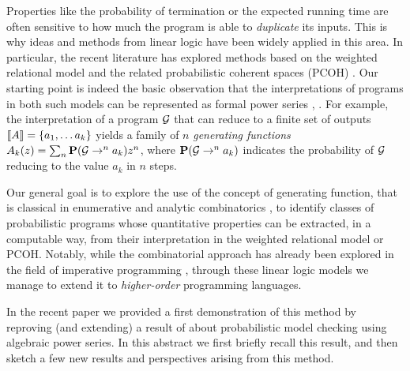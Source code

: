 \documentclass{easychair}
\begin{document}
Properties like the probability of termination or the expected running time are often sensitive to how much the program is able to \emph{duplicate} its inputs. This is why ideas and methods from linear logic have been widely applied in this area. 
%
In particular, the recent literature has explored methods based on the weighted relational model \cite{DBLP:conf/lics/LairdMMP13} and the related probabilistic coherent spaces (PCOH) \cite{DBLP:journals/jacm/EhrhardPT18}. 
Our starting point is indeed the basic observation that the interpretations of programs in both such models can be represented as formal power series \cite{DBLP:journals/corr/abs-2501-15637}, \cite{LAMARCHE199237}. For example, the interpretation of a program $\mathcal{G}$ that can reduce to a finite set of outputs $\llbracket A\rrbracket=\{a_1, \dots a_k\}$ yields a family of $n$ \emph{generating functions} $A_k(z) = \sum_n \mathbf{P}(\mathcal{G} \to^n a_k)z^n$, where $\mathbf{P}(\mathcal{G} \to^n a_k)$ indicates the probability of $\mathcal{G}$ reducing to the value $a_k$ in $n$ steps.

Our general goal is to explore the use of the concept of generating function, that is classical in enumerative and analytic combinatorics  \cite{DBLP:books/daglib/0023751,DBLP:series/tmsc/KauersP11}, to identify classes of probabilistic programs whose quantitative properties can be extracted, in a computable way, from their interpretation in the weighted relational model or PCOH. 
%
Notably, while the combinatorial approach has already been explored in the field of imperative programming \cite{Klinkenberg2024}, through these linear logic models we manage to extend it to \emph{higher-order} programming languages.

 In the recent paper \cite{lago2026higherorderprobabilisticverificationweighted} we provided a first demonstration of this method by reproving (and extending) a result of \cite{DBLP:conf/lics/LiMO22} about probabilistic model checking using algebraic power series. In this abstract we first briefly recall this result, and then sketch a few new results and perspectives 
arising from this method. 
\end{document}
